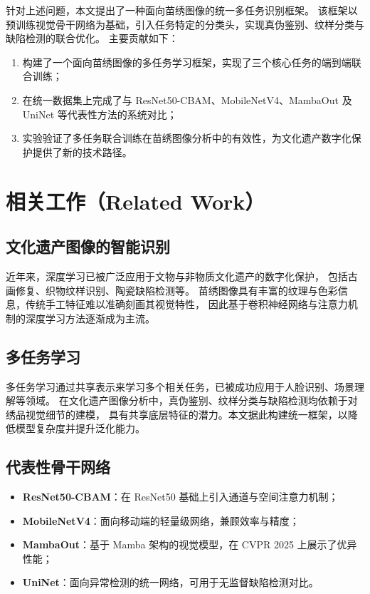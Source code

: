 \documentclass[12pt,a4paper]{article}
\begin{document}
针对上述问题，本文提出了一种面向苗绣图像的统一多任务识别框架。
该框架以预训练视觉骨干网络为基础，引入任务特定的分类头，实现真伪鉴别、纹样分类与缺陷检测的联合优化。
主要贡献如下：
\begin{enumerate}
    \item 构建了一个面向苗绣图像的多任务学习框架，实现了三个核心任务的端到端联合训练；
    \item 在统一数据集上完成了与 ResNet50-CBAM、MobileNetV4、MambaOut 及 UniNet 等代表性方法的系统对比；
    \item 实验验证了多任务联合训练在苗绣图像分析中的有效性，为文化遗产数字化保护提供了新的技术路径。
\end{enumerate}

\section{相关工作（Related Work）}

\subsection{文化遗产图像的智能识别}
近年来，深度学习已被广泛应用于文物与非物质文化遗产的数字化保护，
包括古画修复、织物纹样识别、陶瓷缺陷检测等\cite{he2016deep}。
苗绣图像具有丰富的纹理与色彩信息，传统手工特征难以准确刻画其视觉特性，
因此基于卷积神经网络与注意力机制的深度学习方法逐渐成为主流。

\subsection{多任务学习}
多任务学习通过共享表示来学习多个相关任务，已被成功应用于人脸识别、场景理解等领域\cite{vaswani2017attention}。
在文化遗产图像分析中，真伪鉴别、纹样分类与缺陷检测均依赖于对绣品视觉细节的建模，
具有共享底层特征的潜力。本文据此构建统一框架，以降低模型复杂度并提升泛化能力。

\subsection{代表性骨干网络}
\begin{itemize}
    \item \textbf{ResNet50-CBAM}：在 ResNet50 基础上引入通道与空间注意力机制\cite{wang2018cbam}；
    \item \textbf{MobileNetV4}：面向移动端的轻量级网络，兼顾效率与精度；
    \item \textbf{MambaOut}：基于 Mamba 架构的视觉模型，在 CVPR 2025 上展示了优异性能\cite{yu2025mambaout}；
    \item \textbf{UniNet}：面向异常检测的统一网络\cite{wei2025uninet}，可用于无监督缺陷检测对比。
\end{itemize}
\end{document}
